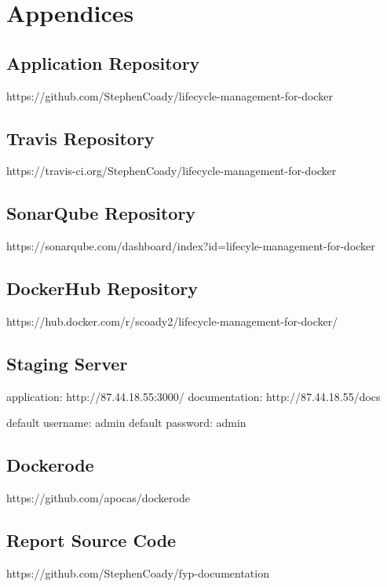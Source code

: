 \appendix
\section*{Appendices}
\renewcommand{\thesubsection}{\Alph{subsection}}

\subsection{Application Repository}
\label{appendix:code}
https://github.com/StephenCoady/lifecycle-management-for-docker

\subsection{Travis Repository} 
\label{appendix:travis}
https://travis-ci.org/StephenCoady/lifecycle-management-for-docker

\subsection{SonarQube Repository} 
\label{appendix:sonarqube}
https://sonarqube.com/dashboard/index?id=lifecyle-management-for-docker

\subsection{DockerHub Repository} 
\label{appendix:dockerhub}
https://hub.docker.com/r/scoady2/lifecycle-management-for-docker/

\subsection{Staging Server} 
\label{appendix:staging}
application: http://87.44.18.55:3000/ \newline
documentation: http://87.44.18.55/docs

default username: admin \newline
default password: admin

\subsection{Dockerode} 
\label{appendix:dockerode_appendix}
https://github.com/apocas/dockerode

\subsection{Report Source Code} 
\label{appendix:reports}
https://github.com/StephenCoady/fyp-documentation

